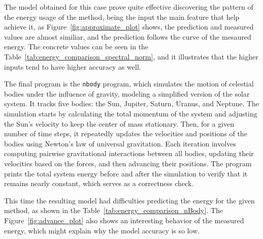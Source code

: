The model obtained for this case prove quite effective discovering the pattern of the energy usage of the method, being the input the main feature that help achieve it, as Figure~\ref{fig:approximate_plot} shows, the prediction and measured values are almost similiar, and the prediction follows the curve of the mesaured energy. The concrete values can be seen in the Table~\ref{tab:energy_comparison_spectral_norm}, and it illustrates that the higher inputs tend to have higher accuracy as well.

The final program is the \texttt{nbody} program, which simulates the motion of celestial bodies under the influence of gravity, modeling a simplified version of the solar system. It tracks five bodies: the Sun, Jupiter, Saturn, Uranus, and Neptune. The simulation starts by calculating the total momentum of the system and adjusting the Sun’s velocity to keep the center of mass stationary. Then, for a given number of time steps, it repeatedly updates the velocities and positions of the bodies using Newton’s law of universal gravitation. Each iteration involves computing pairwise gravitational interactions between all bodies, updating their velocities based on the forces, and then advancing their positions. The program prints the total system energy before and after the simulation to verify that it remains nearly constant, which serves as a correctness check.


This time the resulting model had difficulties predicting the energy for the given method, as shown in the Table~\ref{tab:energy_comparison_nBody}. The Figure~\ref{fig:advance_plot} also shows an interesting behavior of the measured energy, which might explain why the model accuracy is so low.


\begin{table}[htbp]
  \centering
  \footnotesize
  \setlength{\tabcolsep}{10pt} 
  \caption{Comparison of actual and predicted energy consumption for nBody program}
  \label{tab:energy_comparison_nBody}
\end{table}

